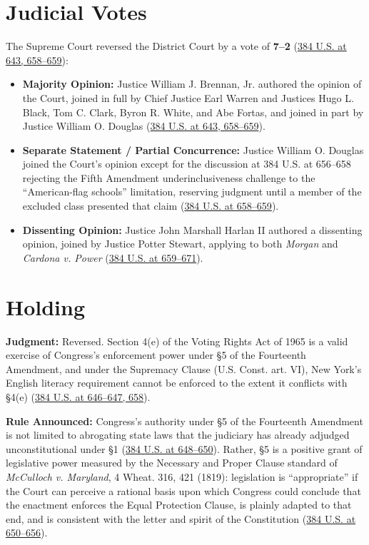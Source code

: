 \documentclass[12pt]{article}
\begin{document}
\section{Judicial Votes}

The Supreme Court reversed the District Court by a vote of \textbf{7--2} (\href{https://supreme.justia.com/cases/federal/us/384/641/}{384 U.S. at 643, 658--659}):

\begin{itemize}
\item \textbf{Majority Opinion:} Justice William J. Brennan, Jr. authored the opinion of the Court, joined in full by Chief Justice Earl Warren and Justices Hugo L. Black, Tom C. Clark, Byron R. White, and Abe Fortas, and joined in part by Justice William O. Douglas (\href{https://supreme.justia.com/cases/federal/us/384/641/}{384 U.S. at 643, 658--659}).
\item \textbf{Separate Statement / Partial Concurrence:} Justice William O. Douglas joined the Court's opinion except for the discussion at 384 U.S. at 656--658 rejecting the Fifth Amendment underinclusiveness challenge to the ``American-flag schools'' limitation, reserving judgment until a member of the excluded class presented that claim (\href{https://supreme.justia.com/cases/federal/us/384/641/}{384 U.S. at 658--659}).
\item \textbf{Dissenting Opinion:} Justice John Marshall Harlan II authored a dissenting opinion, joined by Justice Potter Stewart, applying to both \textit{Morgan} and \textit{Cardona v. Power} (\href{https://supreme.justia.com/cases/federal/us/384/641/}{384 U.S. at 659--671}).
\end{itemize}

\section{Holding}

\textbf{Judgment:} Reversed. Section 4(e) of the Voting Rights Act of 1965 is a valid exercise of Congress's enforcement power under \S 5 of the Fourteenth Amendment, and under the Supremacy Clause (U.S. Const. art. VI), New York's English literacy requirement cannot be enforced to the extent it conflicts with \S 4(e) (\href{https://supreme.justia.com/cases/federal/us/384/641/}{384 U.S. at 646--647, 658}).

\textbf{Rule Announced:} Congress's authority under \S 5 of the Fourteenth Amendment is not limited to abrogating state laws that the judiciary has already adjudged unconstitutional under \S 1 (\href{https://supreme.justia.com/cases/federal/us/384/641/}{384 U.S. at 648--650}). Rather, \S 5 is a positive grant of legislative power measured by the Necessary and Proper Clause standard of \textit{McCulloch v. Maryland}, 4 Wheat. 316, 421 (1819): legislation is ``appropriate'' if the Court can perceive a rational basis upon which Congress could conclude that the enactment enforces the Equal Protection Clause, is plainly adapted to that end, and is consistent with the letter and spirit of the Constitution (\href{https://supreme.justia.com/cases/federal/us/384/641/}{384 U.S. at 650--656}).
\end{document}
